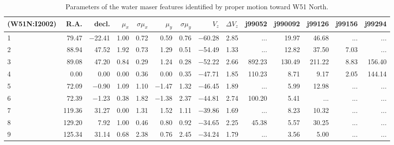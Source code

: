 \begin{table*}[p]
\caption{Parameters of the water maser features identified by 
proper motion toward W51 North.} \label{tab:pmotionsN}
{\scriptsize
\begin{tabular}{l@{ }r@{ \ }rr@{ \ }rr@{ \ }rrrr@{ \ }r@{ \ }r@{ \ }r@{ \ }r} \hline \hline                                 
(W51N:I2002) & R.A. & decl. & $\mu_{x}$ & $\sigma \mu_{x}$ & $\mu_{y}$ & $\sigma \mu_{y}$ & $V_{z}$ & $\Delta V_{z}$ & j99052 & j990092 & j99126 & j99156 & j99294 \\  
 \hline
  1   \ \dotfill \  &     79.47 &   $-$22.41 &    1.00 &   0.72 &    0.59 &   0.76 & $-$60.28 &   2.85 &    ...     &       19.97 &       46.68 &    ...     &    ...       \\     
  2   \ \dotfill \  &     88.94 &     47.52 &    1.92 &   0.73 &    1.29 &   0.51 & $-$54.49 &   1.33 &    ...     &       12.82 &       37.50 &        7.03 &    ...       \\     
  3   \ \dotfill \  &     89.08 &     47.20 &    0.84 &   0.29 &    1.24 &   0.28 & $-$52.22 &   2.66 &      892.23 &      130.49 &      211.22 &        8.83 &      156.40   \\     
  4   \ \dotfill \  &      0.00 &      0.00 &    0.00 &   0.36 &    0.00 &   0.35 & $-$47.71 &   1.85 &      110.23 &        8.71 &        9.17 &        2.05 &      144.14   \\     
  5   \ \dotfill \  &     72.09 &    $-$0.90 &    1.09 &   1.10 &  $-$1.47 &   1.32 & $-$46.45 &   1.89&    ...     &        5.99 &       12.98 &    ...     &    ...       \\     
  6   \ \dotfill \  &     72.39 &    $-$1.23 &    0.38 &   1.82 &  $-$1.38 &   2.37 & $-$44.81 &   2.74&      100.20 &        5.41 &    ...     &    ...     &    ...       \\     
  7   \ \dotfill \  &    119.36 &     31.27 &    0.00 &   1.31 &    1.52 &   1.11 & $-$39.86 &   1.69 &    ...     &        8.23 &       10.32 &    ...     &    ...       \\     
  8   \ \dotfill \  &    129.20 &      7.92 &    1.00 &   0.46 &    0.80 &   0.92 & $-$34.65 &   2.25 &       45.38 &        5.57 &       30.25 &    ...     &    ...       \\     
  9   \ \dotfill \  &    125.34 &     31.14 &    0.68 &   2.38 &    0.76 &   2.45 & $-$34.24 &   1.79 &    ...     &        3.56 &        5.00 &    ...     &    ...       \\     

\end{tabular}}
\end{table*}
